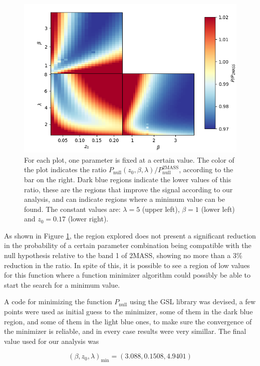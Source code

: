 \documentclass[openany,a4paper,12pt,oneside]{book}
\begin{document}
\begin{spacing}{1.5}
\begin{figure}[!htb]
	\centering
	\includegraphics[width=.92\linewidth]{Imagens/triple_colorplot.png}
	\caption{For each plot, one parameter is fixed at a certain value. The color of the plot indicates the ratio $P_\text{null}(z_0, \beta,\lambda)/P_\text{null}^\text{2MASS}$, according to the bar on the right. Dark blue regions indicate the lower values of this ratio, these are the regions that improve the signal according to our analysis, and can indicate regions where a minimum value can be found. The constant values are: $\lambda=5$ (upper left), $\beta=1$ (lower left) and $z_0=0.17$ (lower right).}
	\label{fig:Triple_ColorPlots}
\end{figure}

As shown in Figure \ref{fig:Triple_ColorPlots}, the region explored does not present a significant reduction in the probability of a certain parameter combination being compatible with the null hypothesis relative to the band 1 of 2MASS, showing no more than a 3\% reduction in the ratio. In spite of this, it is possible to see a region of low values for this function where a function minimizer algorithm could possibly be able to start the search for a minimum value.

A code for minimizing the function $P_\text{null}$ using the GSL library \cite{gsl-manual} was devised, a few points were used as initial guess to the minimizer, some of them in the dark blue region, and some of them in the light blue ones, to make sure the convergence of the minimizer is reliable, and in every case results were very simillar. The final value used for our analysis was

\begin{equation}\label{minimizer}
	(\beta, z_0, \lambda)_\text{min}=(3.088, 0.1508, 4.9401)
\end{equation}


\end{spacing}
\end{document}
